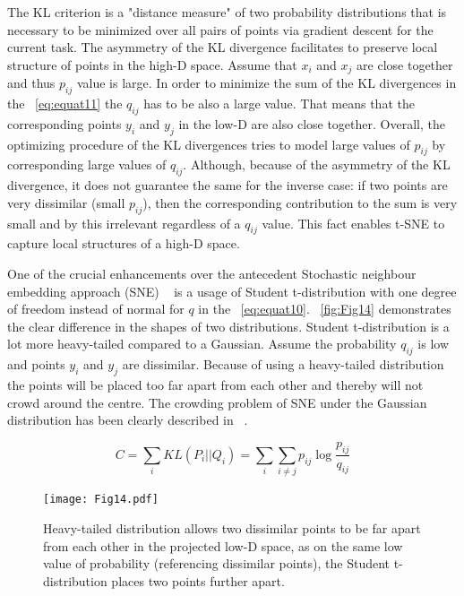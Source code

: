 The KL criterion is a "distance measure" of two probability distributions that is necessary to be minimized over all pairs of points via gradient descent for the current task. The asymmetry of the KL divergence facilitates to preserve local structure of points in the high-D space. Assume that $x_i$ and $x_j$ are close together and thus $p_{ij}$ value is large. In order to minimize the sum of the KL divergences in the ~\autoref{eq:equat11} the $q_{ij}$ has to be also a large value. That means that the corresponding points $y_i$ and $y_j$ in the low-D are also close together. Overall, the optimizing procedure of the KL divergences tries to model large values of $p_{ij}$ by corresponding large values of $q_{ij}$. Although, because of the asymmetry of the KL divergence, it does not guarantee the same for the inverse case: if two points are very dissimilar (small $p_{ij}$), then the corresponding contribution to the sum is very small and by this irrelevant regardless of a $q_{ij}$ value. This fact enables t-SNE to capture local structures of a high-D space.

One of the crucial enhancements over the antecedent Stochastic neighbour embedding approach (SNE) ~\cite{hinton2003stochastic} is a usage of Student t-distribution with one degree of freedom instead of normal for $q$ in the ~\autoref{eq:equat10}. ~\autoref{fig:Fig14} demonstrates the clear difference in the shapes of two distributions. Student t-distribution is a lot more heavy-tailed compared to a Gaussian. Assume the probability $q_{ij}$ is low and points $y_i$ and $y_j$ are dissimilar. Because of using a heavy-tailed distribution the points will be placed too far apart from each other and thereby will not crowd around the centre. The crowding problem of SNE under the Gaussian distribution has been clearly described in ~\cite{maaten2008visualizing}.

\begin{equation}
  C = \sum_{i}KL(P_i||Q_i)=\sum_{i}\sum_{i\neq j}p_{ij}\log{\frac{p_{ij}}{q_{ij}}}
    \label{eq:equat11}
\end{equation}

\begin{figure}[!hp]
    \centering
    \texttt{[image: Fig14.pdf]}
    \caption{Heavy-tailed distribution allows two dissimilar points to be far apart from each other in the projected low-D space, as on the same low value of probability (referencing dissimilar points), the Student t-distribution places two points further apart.}
    \label{fig:Fig14}
\end{figure}

